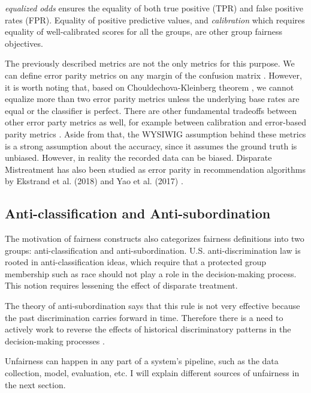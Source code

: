         \textit{equalized odds} \cite{hardt2016equality} ensures the equality of both true positive (TPR) and false positive rates (FPR). Equality of positive predictive values, and \textit{calibration} \cite{Kleinberg:InherentTrade} which requires equality of well-calibrated scores for all the groups, are other group fairness objectives.
        
        The previously described metrics are not the only metrics for this purpose. We can define error parity metrics on any margin of the confusion matrix \cite{mitchell2021algorithmic}. However, it is worth noting that, based on Chouldechova-Kleinberg theorem \cite{chouldechova2017fair,Kleinberg:InherentTrade}, we cannot equalize more than two error parity metrics unless the underlying base rates are equal or the classifier is perfect. There are other fundamental tradeoffs between other error party metrics as well, for example between calibration and error-based parity metrics \cite{pleiss2017fairness}. Aside from that, the WYSIWIG assumption behind these metrics is a strong assumption about the accuracy, since it assumes the ground truth is unbiased. However, in reality the recorded data can be biased. Disparate Mistreatment has also been studied as error parity in recommendation algorithms by Ekstrand et al. (2018) and Yao et al. (2017) \cite{ekstrand2018all,yao_huang_fatml-2017}.

    
    \subsection{Anti-classification and Anti-subordination}
        
        The motivation of fairness constructs also categorizes fairness definitions into two groups: anti-classification and anti-subordination. U.S. anti-discrimination law is rooted in anti-classification ideas, which require that a protected group membership such as race should not play a role in the decision-making process. This notion requires lessening the effect of disparate treatment.
        
        The theory of anti-subordination says that this rule is not very effective because the past discrimination carries forward in time. Therefore there is a need to actively work to reverse the effects of historical discriminatory patterns in the decision-making processes \cite{barocas2016big}.
    
    Unfairness can happen in any part of a system's pipeline, such as the data collection, model, evaluation, etc. I will explain different sources of unfairness in the next section.


